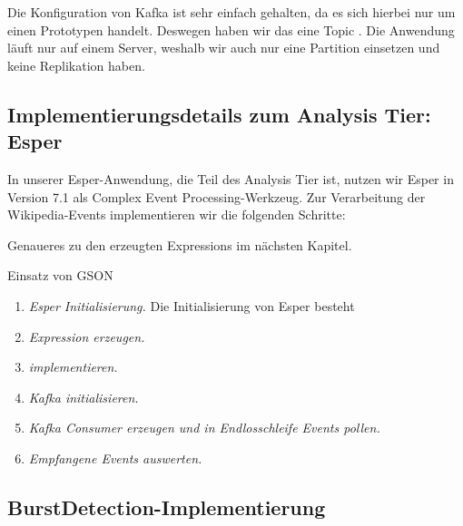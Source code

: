 Die Konfiguration von Kafka ist sehr einfach gehalten, da es sich hierbei nur um einen Prototypen handelt.
Deswegen haben wir das eine Topic . Die Anwendung läuft nur auf einem Server, weshalb wir auch nur
eine Partition einsetzen und keine Replikation haben.

\subsection{Implementierungsdetails zum Analysis Tier: Esper}
In unserer Esper-Anwendung, die Teil des Analysis Tier ist, nutzen wir Esper in Version 7.1 als Complex Event Processing-Werkzeug. Zur Verarbeitung
der Wikipedia-Events implementieren wir die folgenden Schritte:

Genaueres zu den erzeugten Expressions im nächsten Kapitel.

Einsatz von GSON

\begin{enumerate}
    \item \textit{Esper Initialisierung.} Die Initialisierung von Esper besteht
    \item \textit{Expression erzeugen.}
    \item \textit{ implementieren.}
    \item \textit{Kafka initialisieren.}
    \item \textit{Kafka Consumer erzeugen und in Endlosschleife Events pollen.}
    \item \textit{Empfangene Events auswerten.}
\end{enumerate}


\subsection{BurstDetection-Implementierung}